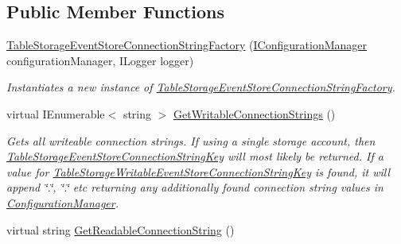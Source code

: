 \subsection*{Public Member Functions}
\begin{DoxyCompactItemize}
\item 
\hyperlink{classCqrs_1_1Azure_1_1BlobStorage_1_1Events_1_1TableStorageEventStoreConnectionStringFactory_a48d61b35856515a2bfb0674c1fa57995_a48d61b35856515a2bfb0674c1fa57995}{Table\+Storage\+Event\+Store\+Connection\+String\+Factory} (\hyperlink{interfaceCqrs_1_1Configuration_1_1IConfigurationManager}{I\+Configuration\+Manager} configuration\+Manager, I\+Logger logger)
\begin{DoxyCompactList}\small\item\em Instantiates a new instance of \hyperlink{classCqrs_1_1Azure_1_1BlobStorage_1_1Events_1_1TableStorageEventStoreConnectionStringFactory}{Table\+Storage\+Event\+Store\+Connection\+String\+Factory}. \end{DoxyCompactList}\item 
virtual I\+Enumerable$<$ string $>$ \hyperlink{classCqrs_1_1Azure_1_1BlobStorage_1_1Events_1_1TableStorageEventStoreConnectionStringFactory_a07406c2607bdd42dd13116b92fc6b665_a07406c2607bdd42dd13116b92fc6b665}{Get\+Writable\+Connection\+Strings} ()
\begin{DoxyCompactList}\small\item\em Gets all writeable connection strings. If using a single storage account, then \hyperlink{classCqrs_1_1Azure_1_1BlobStorage_1_1Events_1_1TableStorageEventStoreConnectionStringFactory_a95f8662029c8a40117e326973de936bf_a95f8662029c8a40117e326973de936bf}{Table\+Storage\+Event\+Store\+Connection\+String\+Key} will most likely be returned. If a value for \hyperlink{classCqrs_1_1Azure_1_1BlobStorage_1_1Events_1_1TableStorageEventStoreConnectionStringFactory_a73df7618d5978a2c0d2e69880b799369_a73df7618d5978a2c0d2e69880b799369}{Table\+Storage\+Writable\+Event\+Store\+Connection\+String\+Key} is found, it will append \char`\"{}.\char`\"{}, \char`\"{}.\char`\"{} etc returning any additionally found connection string values in \hyperlink{namespaceCqrs_1_1Azure_1_1ConfigurationManager}{Configuration\+Manager}. \end{DoxyCompactList}\item 
virtual string \hyperlink{classCqrs_1_1Azure_1_1BlobStorage_1_1Events_1_1TableStorageEventStoreConnectionStringFactory_a047e58aa30e97231dc913df350bc2446_a047e58aa30e97231dc913df350bc2446}{Get\+Readable\+Connection\+String} ()

\end{DoxyCompactItemize}
